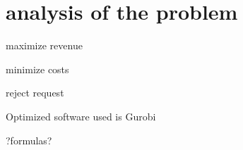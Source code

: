 \section{analysis of the problem}
 
maximize revenue

minimize costs

reject request

Optimized software used is Gurobi

?formulas?